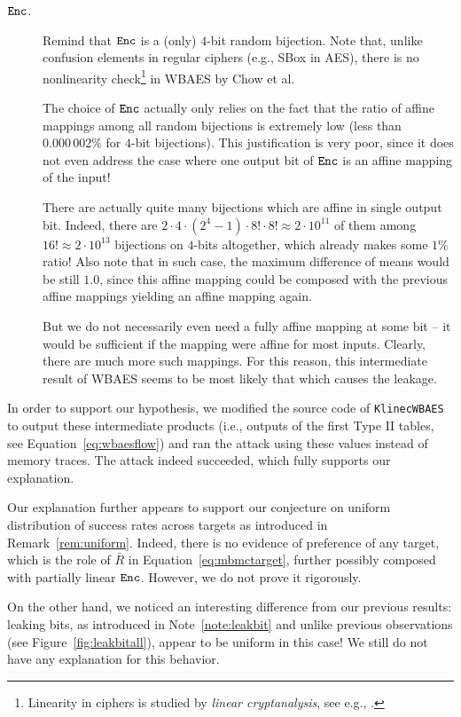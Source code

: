 \begin{description}
	\item[$\texttt{Enc}$.] Remind that $\texttt{Enc}$ is a (only) $4$-bit random bijection. Note that, unlike confusion elements in regular ciphers (e.g., SBox in AES), there is no nonlinearity check\footnote{Linearity in ciphers is studied by {\em linear cryptanalysis}, see e.g., \cite{matsui1993linear}.} in WBAES by Chow et al.
	
	The choice of $\texttt{Enc}$ actually only relies on the fact that the ratio of affine mappings among all random bijections is extremely low (less than $0.000\,002\%$ for $4$-bit bijections). This justification is very poor, since it does not even address the case where one output bit of $\texttt{Enc}$ is an affine mapping of the input!
	
	There are actually quite many bijections which are affine in single output bit. Indeed, there are $2\cdot4\cdot(2^4-1)\cdot8!\cdot8! \approx 2\cdot10^{11}$ of them among $16! \approx 2\cdot10^{13}$ bijections on $4$-bits altogether, which already makes some $1\%$ ratio! Also note that in such case, the maximum difference of means would be still $1.0$, since this affine mapping could be composed with the previous affine mappings yielding an affine mapping again.
	
	But we do not necessarily even need a fully affine mapping at some bit -- it would be sufficient if the mapping were affine for most inputs. Clearly, there are much more such mappings. For this reason, this intermediate result of WBAES seems to be most likely that which causes the leakage.
\end{description}

In order to support our hypothesis, we modified the source code of {\tt KlinecWBAES} to output these intermediate products (i.e., outputs of the first Type II tables, see Equation~\ref{eq:wbaesflow}) and ran the attack using these values instead of memory traces. The attack indeed succeeded, which fully supports our explanation.

\begin{note}
\label{note:leakbituniform}
	Our explanation further appears to support our conjecture on uniform distribution of success rates across targets as introduced in Remark~\ref{rem:uniform}. Indeed, there is no evidence of preference of any target, which is the role of $\bar R$ in Equation~\ref{eq:mbmctarget}, further possibly composed with partially linear $\texttt{Enc}$. However, we do not prove it rigorously.
	
	On the other hand, we noticed an interesting difference from our previous results: leaking bits, as introduced in Note~\ref{note:leakbit} and unlike previous observations (see Figure~\ref{fig:leakbitall}), appear to be uniform in this case! We still do not have any explanation for this behavior.
\end{note}


